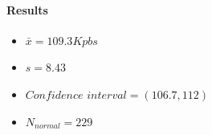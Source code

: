 \documentclass[aps,letterpaper,10pt]{revtex4}
\begin{document}
            \paragraph{Results}
                \begin{itemize}
                    \item $\bar{x} = 109.3 Kpbs$
                    \item $s = 8.43$
                    \item $Confidence$ $interval =(106.7 , 112) $
                    \item $N_{normal} = 229$
                \end{itemize}
            \vspace{3mm}           
             \begin{figure}[htp]
                \begin{center}
                \end{center}    
            \end{figure}   
            \vspace{3mm}
\end{document}
